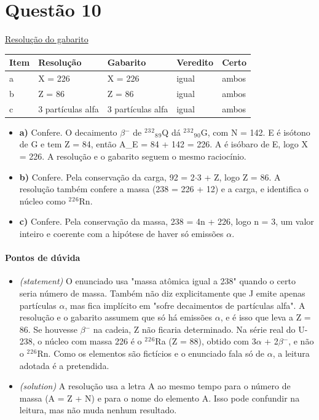 \documentclass{article}%
\begin{document}
\section*{Questão 10}%
\href{https://poliedroresolve.sistemapoliedro.com.br/vestibulares/ita/2026/ita-2-fase-dia-2-29-10-2025-2-fase-dia-2/dissertativa-10-quimica-2-fase-dia-2-ita-2026}{Resolução do gabarito}\par\smallskip%
\begin{longtable}{@{}p{} p{} p{} p{} p{}@{}}\toprule Item & Resolução & Gabarito & Veredito & Certo \\ \midrule
a & X = 226 & X = 226 & igual & ambos \\
b & Z = 86 & Z = 86 & igual & ambos \\
c & 3 partículas alfa & 3 partículas alfa & igual & ambos \\
\bottomrule\end{longtable}%
\begin{itemize}%
\item%
\textbf{a)} Confere. O decaimento $\beta$$^{-}$ de $^2$$^3$$^2$$_{8}$$_{9}$Q dá $^2$$^3$$^2$$_{9}$$_{0}$G, com N = 142. E é isótono de G e tem Z = 84, então A\_E = 84 + 142 = 226. A é isóbaro de E, logo X = 226. A resolução e o gabarito seguem o mesmo raciocínio.%
\item%
\textbf{b)} Confere. Pela conservação da carga, 92 = 2$\cdot$3 + Z, logo Z = 86. A resolução também confere a massa (238 = 226 + 12) e a carga, e identifica o núcleo como $^2$$^2$$^{6}$Rn.%
\item%
\textbf{c)} Confere. Pela conservação da massa, 238 = 4n + 226, logo n = 3, um valor inteiro e coerente com a hipótese de haver só emissões $\alpha$.%
\end{itemize}%
\paragraph{Pontos de dúvida}%
\begin{itemize}%
\item%
\textit{(statement)} O enunciado usa "massa atômica igual a 238" quando o certo seria número de massa. Também não diz explicitamente que J emite apenas partículas $\alpha$, mas fica implícito em "sofre decaimentos de partículas alfa". A resolução e o gabarito assumem que só há emissões $\alpha$, e é isso que leva a Z = 86. Se houvesse $\beta$$^{-}$ na cadeia, Z não ficaria determinado. Na série real do U{-}238, o núcleo com massa 226 é o $^2$$^2$$^{6}$Ra (Z = 88), obtido com 3$\alpha$ + 2$\beta$$^{-}$, e não o $^2$$^2$$^{6}$Rn. Como os elementos são fictícios e o enunciado fala só de $\alpha$, a leitura adotada é a pretendida.%
\item%
\textit{(solution)} A resolução usa a letra A ao mesmo tempo para o número de massa (A = Z + N) e para o nome do elemento A. Isso pode confundir na leitura, mas não muda nenhum resultado.%
\end{itemize}%
\end{document}
